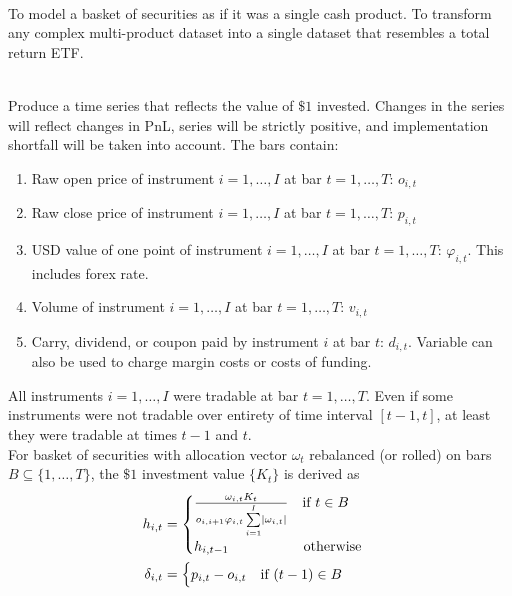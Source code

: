 \begin{definition} \\
To model a basket of securities as if it was a single cash product. To transform any complex multi-product dataset into a single dataset that resembles a total return ETF.
\end{definition}

\begin{method} \\
Produce a time series that reflects the value of $\$1$ invested. Changes in the series will reflect changes in PnL, series will be strictly positive, and implementation shortfall will be taken into account. The bars contain:
\begin{enumerate}[label=\roman*.]
\setlength{\itemsep}{0pt}
\item Raw open price of instrument $i = 1, \ldots, I$ at bar $t = 1, \ldots, T$: $o_{i,t}$
\item Raw close price of instrument $i = 1, \ldots, I$ at bar $t = 1, \ldots, T$: $p_{i,t}$
\item USD value of one point of instrument $i = 1, \ldots, I$ at bar $t = 1, \ldots, T$: $\varphi_{i,t}$. This includes forex rate.
\item Volume of instrument $i = 1, \ldots, I$ at bar $t = 1, \ldots, T$: $v_{i,t}$
\item Carry, dividend, or coupon paid by instrument $i$ at bar $t$: $d_{i,t}$. Variable can also be used to charge margin costs or costs of funding.
\end{enumerate}
All instruments $i = 1, \ldots, I$ were tradable at bar $t = 1, \ldots, T$. Even if some instruments were not tradable over entirety of time interval $[t-1, t]$, at least they were tradable at times $t-1$ and $t$.\\
For basket of securities with allocation vector $\omega_t$ rebalanced (or rolled) on bars $B \subseteq \{1, \ldots, T \}$, the $\$1$ investment value $\{K_t\}$ is derived as 
\begin{align}
h_{i,t} &= 
\begin{cases}
\frac{\omega_{i,t} K_t}{o_{i, i+1} \varphi_{i,t} \sum\limits_{i=1}^I \left\lvert\omega_{i,t}\right\rvert} \ \ \ \text{if } t \in B \\
h_{i, t - 1} \ \ \ \ \ \ \ \ \ \ \ \ \ \ \ \ \text{otherwise}
\end{cases} \nonumber \\
\delta_{i,t} &=
\begin{cases}
p_{i,t} - o_{i,t} \ \ \ \text{if } (t-1) \in B \\

\end{cases}
\end{align}
\end{method}

